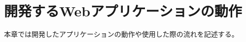 \documentclass[main]{subfiles}
\begin{document}
\chapter{開発するWebアプリケーションの動作}
\label{cha:motion}
本章では開発したアプリケーションの動作や使用した際の流れを記述する。
\end{document}
